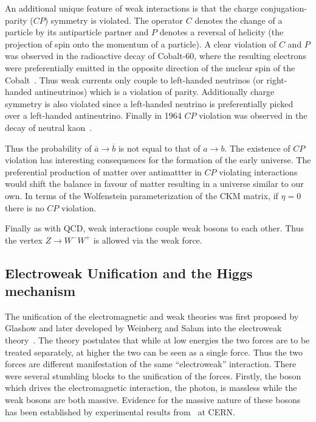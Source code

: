 An additional unique feature of weak interactions is that the charge conjugation-parity ($CP$) symmetry is violated. The operator $C$ denotes the change of a particle by its antiparticle partner and $P$ denotes a reversal of helicity (the projection of spin onto the momentum of a particle). A clear violation of $C$ and $P$ was observed in the radioactive decay of Cobalt-60, where the resulting electrons were preferentially emitted in the opposite direction of the nuclear spin of the Cobalt~\cite{Experimentalb}. Thus weak currents only couple to left-handed neutrinos (or right-handed antineutrinos) which is a violation of parity. Additionally charge symmetry is also violated since a left-handed neutrino is preferentially picked over a left-handed antineutrino. Finally in 1964 $CP$ violation was observed in the decay of neutral kaon~\cite{Evidence}.

Thus the probability of $\overline{a}\rightarrow \overline{b}$ is not equal to that of $a\rightarrow b$. The existence of $CP$ violation has interesting consequences for the formation of the early universe. The preferential production of matter over antimattter in $CP$ violating interactions would shift the balance in favour of matter resulting in a universe similar to our own. In terms of the Wolfenstein parameterization of the CKM matrix, if $\eta=0$ there is no $CP$ violation.

Finally as with QCD, weak interactions couple weak bosons to each other. Thus the vertex $Z\rightarrow W^-W^+$ is allowed via the weak force.

\subsection{Electroweak Unification and the Higgs mechanism}

The unification of the electromagnetic and weak theories was first proposed by Glashow and later developed by Weinberg and Salam into the electroweak theory~\cite{Model,Theory:WeakInteractionsGlashow,Theory:WeakAndEMSalam}. The theory postulates that while at low energies the two forces are to be treated separately, at higher the two can be seen as a single force. Thus the two forces are different manifestation of the same ``electroweak'' interaction. There were several stumbling blocks to the unification of the forces. Firstly, the boson which drives the electromagnetic interaction, the photon, is massless while the weak bosons are both massive. Evidence for the massive nature of these bosons has been established by experimental results from~\cite{Theory:WBosonObservationPaper} at CERN.


